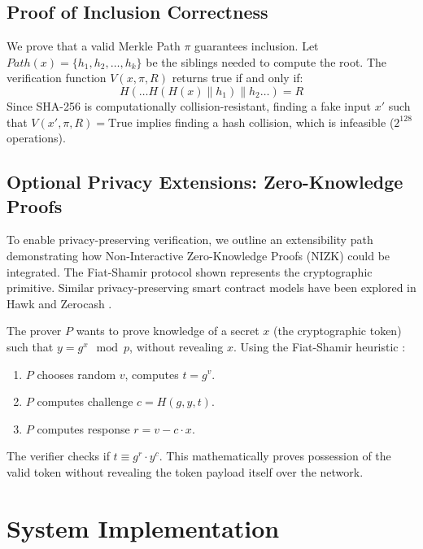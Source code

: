 \documentclass[conference]{IEEEtran}
\begin{document}
\subsection{Proof of Inclusion Correctness}
We prove that a valid Merkle Path $\pi$ guarantees inclusion.
Let $Path(x) = \{h_1, h_2, \dots, h_k\}$ be the siblings needed to compute the root.
The verification function $V(x, \pi, R)$ returns true if and only if:
\begin{equation}
H( \dots H(H(x) \parallel h_1) \parallel h_2 \dots ) = R
\end{equation}
Since SHA-256 is computationally collision-resistant, finding a fake input $x'$ such that $V(x', \pi, R) = \text{True}$ implies finding a hash collision, which is infeasible ($2^{128}$ operations).

\subsection{Optional Privacy Extensions: Zero-Knowledge Proofs}
To enable privacy-preserving verification, we outline an extensibility path demonstrating how Non-Interactive Zero-Knowledge Proofs (NIZK) could be integrated. The Fiat-Shamir protocol shown represents the cryptographic primitive. Similar privacy-preserving smart contract models have been explored in Hawk \cite{b13} and Zerocash \cite{b12}.

The prover $P$ wants to prove knowledge of a secret $x$ (the cryptographic token) such that $y = g^x \mod p$, without revealing $x$.
Using the Fiat-Shamir heuristic \cite{b11}:
\begin{enumerate}
    \item $P$ chooses random $v$, computes $t = g^v$.
    \item $P$ computes challenge $c = H(g, y, t)$.
    \item $P$ computes response $r = v - c \cdot x$.
\end{enumerate}
The verifier checks if $t \equiv g^r \cdot y^c$. This mathematically proves possession of the valid token without revealing the token payload itself over the network.

\section{System Implementation}
\begin{center}
\end{center}
\end{document}

